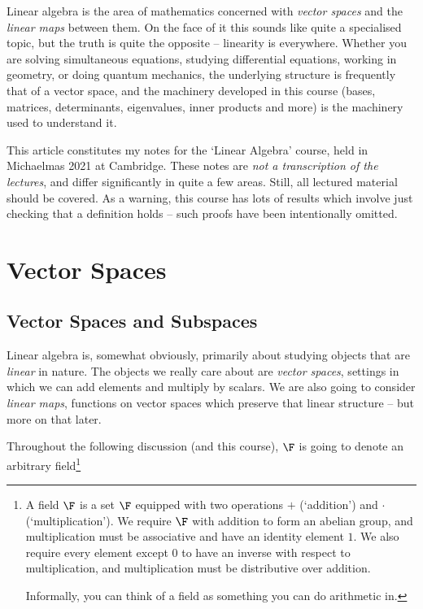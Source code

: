 



Linear algebra is the area of mathematics concerned with \emph{vector spaces} and the \emph{linear maps} between them. On the face of it this sounds like quite a specialised topic, but the truth is quite the opposite -- linearity is everywhere. Whether you are solving simultaneous equations, studying differential equations, working in geometry, or doing quantum mechanics, the underlying structure is frequently that of a vector space, and the machinery developed in this course (bases, matrices, determinants, eigenvalues, inner products and more) is the machinery used to understand it.

This article constitutes my notes for the `Linear Algebra' course, held in Michaelmas 2021 at Cambridge. These notes are \emph{not a transcription of the lectures}, and differ significantly in quite a few areas. Still, all lectured material should be covered. As a warning, this course has lots of results which involve just checking that a definition holds -- such proofs have been intentionally omitted.




\section{Vector Spaces}

\subsection{Vector Spaces and Subspaces}

Linear algebra is, somewhat obviously, primarily about studying objects that are \emph{linear} in nature. The objects we really care about are \emph{vector spaces}, settings in which we can add elements and multiply by scalars. We are also going to consider \emph{linear maps}, functions on vector spaces which preserve that linear structure -- but more on that later. 

Throughout the following discussion (and this course), $\F$ is going to denote an arbitrary field\footnote{A field $\F$ is a set $\F$ equipped with two operations $+$ (`addition') and $\cdot$ (`multiplication'). We require $\F$ with addition to form an abelian group, and multiplication must be associative and have an identity element $1$. We also require every element except $0$ to have an inverse with respect to multiplication, and multiplication must be distributive over addition.

Informally, you can think of a field as something you can do arithmetic in.}

